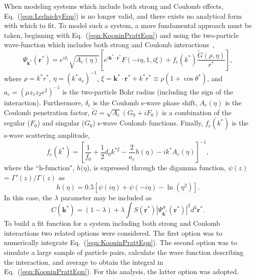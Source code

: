 \documentclass[ALICE,manyauthors]{cernphprep}
\begin{document}
When modeling systems which include both strong and Coulomb effects, Eq.~(\ref{eqn:LednickyEqn}) is no longer valid, and there exists no analytical form with which to fit.
To model such a system, a more fundamental approach must be taken, beginning with Eq.~(\ref{eqn:KooninPrattEqn}) and using the two-particle wave-function which includes both strong and Coulomb interactions~\cite{Lednicky:2005tb},
\begin{equation}
 \Psi_{\mathbf{k^{*}}}(\mathbf{r^{*}}) = e^{i\delta_{\mathrm{c}}}\sqrt{A_{\mathrm{c}}(\eta)}[e^{i\mathbf{k^{*}} \cdot \mathbf{r^{*}}}F(-i\eta,1,i\xi) + f_{\mathrm{c}}(k^{*})\frac{\tilde{G}(\rho,\eta)}{r^{*}}],
\label{eqn:CoulombWaveFcn}
\end{equation}
where $\rho = k^{*}r^{*}$, $\eta = (k^{*}a_{\mathrm{c}})^{-1}$, $\xi = \mathbf{k^{*}} \cdot \mathbf{r^{*}} + k^{*}r^{*} \equiv \rho(1+\cos\theta^{*})$, and $a_{\mathrm{c}} = (\mu z_{1}z_{2}e^{2})^{-1}$ is the two-particle Bohr radius (including the sign of the interaction).  
Furthermore, $\delta_{\mathrm{c}}$ is the Coulomb s-wave phase shift, $A_{\mathrm{c}}(\eta)$ is the Coulomb penetration factor, $\tilde{G} = \sqrt{A_{c}}(G_{0} + iF_{0})$ is a combination of the regular ($F_{0}$) and singular ($G_{0}$) s-wave Coulomb functions.  
Finally, $f_{\mathrm{c}}(k^{*})$ is the s-wave scattering amplitude,
\begin{equation}
 f_{\mathrm{c}}(k^{*}) = \left[\frac{1}{f_{0}} + \frac{1}{2}d_{0}k^{*2} - \frac{2}{a_{\mathrm{c}}}h(\eta) - ik^{*}A_{\mathrm{c}}(\eta)\right]^{-1},
\label{eqn:CoulombScattAmp}
\end{equation}
where the ``h-function", $h(\eta$), is expressed through the digamma function, $\psi(z)$ = $\Gamma'(z)/\Gamma(z)$ as
\begin{equation}
 h(\eta) = 0.5[\psi(i\eta) + \psi(-i\eta) - \ln(\eta^{2})].
\label{eqn:LednickyHFunction}
\end{equation} 
In this case, the $\lambda$ parameter may be included as
\begin{equation}
 C(\mathbf{k^{*}}) = (1 - \lambda) + \lambda\int S(\mathbf{r^{*}})|\Psi^{S}_{\mathbf{k^{*}}}(\mathbf{r^{*}})|^{2}d^{3}\mathbf{r^{*}}.
\label{eqn:GenCfEqnwLambda}
\end{equation}
To build a fit function for a system including both strong and Coulomb interactions two related options were considered. 
The first option was to numerically integrate Eq.~(\ref{eqn:KooninPrattEqn}).  
The second option was to simulate a large sample of particle pairs, calculate the wave function describing the interaction, and average to obtain the integral in Eq.~(\ref{eqn:KooninPrattEqn}). 
For this analysis, the latter option was adopted.
\end{document}
